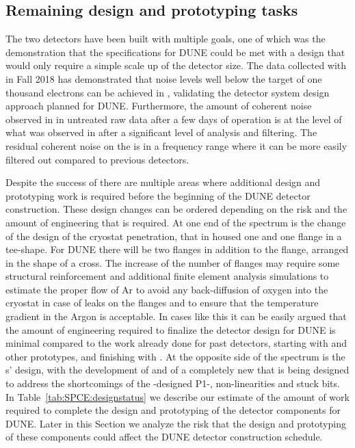 \subsection{Remaining design and prototyping tasks}
\label{sec:fdsp-tpcelec-overview-remaining}

The two  detectors have been built with multiple
goals, one of which was the demonstration that the specifications
for DUNE could be met with a design that would only require a simple
scale up of the detector size. The data collected with 
in Fall 2018 has demonstrated that noise levels well below the target
of one thousand electrons can be achieved in \lar, validating the
detector system design approach planned for DUNE. Furthermore, the amount
of coherent noise observed in  in untreated raw data
after a few days of operation is at the level of what was observed
in  after a significant level of analysis and
filtering. The residual coherent noise on the  is in
a frequency range where it can be more easily filtered out compared 
to previous \lar detectors.

Despite the success of  there are multiple areas where
additional design and prototyping work is required before the
beginning of the DUNE detector construction. These design changes
can be ordered depending on the risk and the amount of engineering
that is required. At one end of the spectrum is the change of the
design of the cryostat penetration, that in  housed one
 and one  flange in a tee-shape. For DUNE
there will be two  flanges in addition to the 
flange, arranged in the shape of a cross. The increase of the number
of flanges may require some structural reinforcement and additional
finite element analysis simulations to estimate the proper flow of
Ar to avoid any back-diffusion of oxygen into the cryostat in case
of leaks on the flanges and to ensure that the temperature gradient
in the Argon is acceptable. In cases like this it can be easily
argued that the amount of engineering required to finalize the
detector design for DUNE is minimal compared to the work already
done for past \lar detectors, starting with \microboone and
other prototypes, and finishing with . At the opposite
side of the spectrum is the s' design, with the
development of  and of a completely new 
that is being designed to address the shortcomings of the -designed
P1-, non-linearities and stuck bits. In Table~\ref{tab:SPCE:designstatus}
we describe our estimate of the amount of work required to complete
the design and prototyping of the  detector components for
DUNE. Later in this Section we analyze the risk that the design
and prototyping of these components could affect the DUNE detector
construction schedule.

